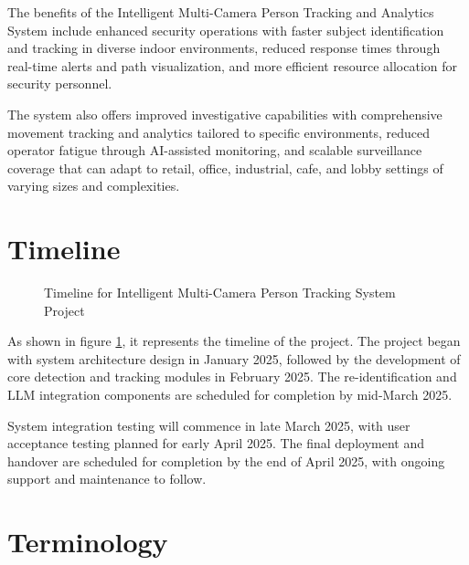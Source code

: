 The benefits of the Intelligent Multi-Camera Person Tracking and Analytics System include enhanced security operations
with faster subject identification and tracking in diverse indoor environments, reduced response times through real-time alerts and path visualization,
and more efficient resource allocation for security personnel.

The system also offers improved investigative capabilities with comprehensive movement tracking and analytics tailored to specific environments,
reduced operator fatigue through AI-assisted monitoring, and scalable surveillance coverage that can adapt to
retail, office, industrial, cafe, and lobby settings of varying sizes and complexities.

\section{Timeline}
\label{section:timeline}

\begin{figure}[h!]
    \centering
    \caption{Timeline for Intelligent Multi-Camera Person Tracking System Project}
    \label{fig:timeline}
\end{figure}

As shown in figure \ref{fig:timeline}, it represents the timeline of the project.
The project began with system architecture design in January 2025, followed by the development of core detection
and tracking modules in February 2025. The re-identification and LLM integration components are scheduled for
completion by mid-March 2025.

System integration testing will commence in late March 2025, with user acceptance testing planned for early April 2025.
The final deployment and handover are scheduled for completion by the end of April 2025, with ongoing support
and maintenance to follow.

\section{Terminology}
\label{section:terminology}

